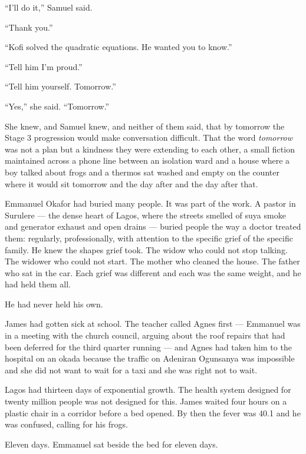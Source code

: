``I'll do it,'' Samuel said.

``Thank you.''

``Kofi solved the quadratic equations. He wanted you to know.''

``Tell him I'm proud.''

``Tell him yourself. Tomorrow.''

``Yes,'' she said. ``Tomorrow.''

She knew, and Samuel knew, and neither of them said, that by tomorrow the Stage 3 progression would make conversation difficult. That the word \emph{tomorrow} was not a plan but a kindness they were extending to each other, a small fiction maintained across a phone line between an isolation ward and a house where a boy talked about frogs and a thermos sat washed and empty on the counter where it would sit tomorrow and the day after and the day after that.


Emmanuel Okafor had buried many people. It was part of the work. A pastor in Surulere --- the dense heart of Lagos, where the streets smelled of suya smoke and generator exhaust and open drains --- buried people the way a doctor treated them: regularly, professionally, with attention to the specific grief of the specific family. He knew the shapes grief took. The widow who could not stop talking. The widower who could not start. The mother who cleaned the house. The father who sat in the car. Each grief was different and each was the same weight, and he had held them all.

He had never held his own.

James had gotten sick at school. The teacher called Agnes first --- Emmanuel was in a meeting with the church council, arguing about the roof repairs that had been deferred for the third quarter running --- and Agnes had taken him to the hospital on an okada because the traffic on Adeniran Ogunsanya was impossible and she did not want to wait for a taxi and she was right not to wait.

Lagos had thirteen days of exponential growth. The health system designed for twenty million people was not designed for this. James waited four hours on a plastic chair in a corridor before a bed opened. By then the fever was 40.1 and he was confused, calling for his frogs.

Eleven days. Emmanuel sat beside the bed for eleven days.

